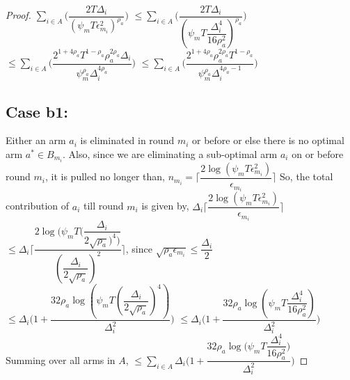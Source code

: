 \begin{proof}
$\sum_{i\in A}\bigg(\dfrac{2T\Delta_{i}}{(\psi_{m}T\epsilon_{m_{i}}^{2})^{\rho_{a}}}\bigg)$
$\leq\sum_{i\in A}\bigg(\dfrac{2T\Delta_{i}}{(\psi_{m}T\dfrac{\Delta_{i}^{4}}{16\rho_{a}^{2}})^{\rho_{a}}}\bigg)$
\newline\hspace*{10em} $\leq \sum_{i\in A}\bigg(\dfrac{2^{1+4\rho_{a}}T^{1-\rho_{a}}\rho_{a}^{2\rho_{a}}\Delta_{i}}{\psi_{m}^{\rho_{a}}\Delta_{i}^{4\rho_{a}}}\bigg)$
\newline\hspace*{10em}
$\leq \sum_{i\in A}\bigg(\dfrac{2^{1+4\rho_{a}}\rho_{a}^{2\rho_{a}}T^{1-\rho_{a}}}{\psi_{m}^{\rho_{a}}\Delta_{i}^{4\rho_{a}-1}}\bigg)$


\subsection{Case b1:} 
Either an arm $a_{i}$ is eliminated in round $m_{i}$ or before or else there is no optimal arm $a^{*}\in B_{m_{i}}$. Also, since we are eliminating a sub-optimal arm $a_{i}$ on or before round $m_{i}$, it is pulled no longer than,
\newline
\hspace*{4em}$n_{m_{i}}=\bigg\lceil\dfrac{2\log{(\psi_{m}T\epsilon_{m_{i}}^{2})}}{\epsilon_{m_{i}}}\bigg\rceil$
\newline
So, the total contribution of $a_{i}$  till round $m_{i}$ is given by,
\newline
\hspace*{4em}$\Delta_{i}\bigg\lceil\dfrac{2\log{(\psi_{m}T\epsilon_{m_{i}}^{2})}}{\epsilon_{m_{i}}}\bigg\rceil$
\newline
\hspace*{4em}
$\leq\Delta_{i}\bigg\lceil\dfrac{2\log{(\psi_{m}T(\dfrac{\Delta_{i}}{2\sqrt{\rho_{a}})^{4})}}}{(\dfrac{\Delta_{i}}{2\sqrt{\rho_{a}}})^{2}}\bigg\rceil$, since $\sqrt{\rho_{a}\epsilon_{m_{i}}}\leq\dfrac{\Delta_{i}}{2}$
\newline
\hspace*{12em}
$\leq\Delta_{i}\bigg(1+\dfrac{32\rho_{a}\log{(\psi_{m}T(\dfrac{\Delta_{i}}{2\sqrt{\rho_{a}}})^{4})}}{\Delta_{i}^{2}}\bigg)$
\newline
\hspace*{12em}
$\leq\Delta_{i}\bigg(1+\dfrac{32\rho_{a}\log{(\psi_{m}T\dfrac{\Delta_{i}^{4}}{16\rho_{a}^{2}})}}{\Delta_{i}^{2}}\bigg)$
\newline
Summing over all arms in $A$,
\newline
\hspace*{4em}$\leq\sum_{i\in A}\Delta_{i}\bigg(1+\dfrac{32\rho_{a}\log{(\psi_{m}T\dfrac{\Delta_{i}^{4}}{16\rho_{a}^{2}}})}{\Delta_{i}^{2}}\bigg)$


\end{proof}
